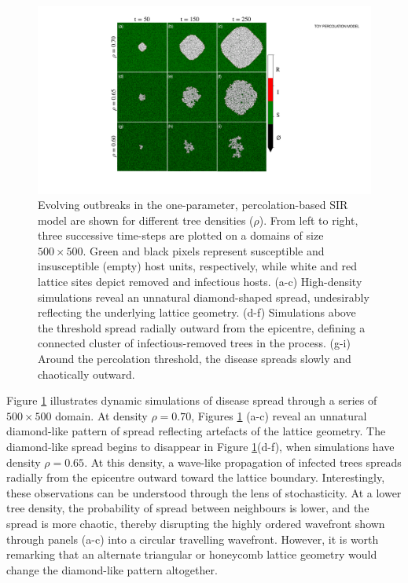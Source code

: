 \begin{figure}
    \centering
    \includegraphics[scale=0.50]{chapter3/figures/figure1-1param-perc.pdf}
    \caption{
        Evolving outbreaks in the one-parameter, percolation-based SIR model are shown for different tree densities ($\rho$).
        From left to right, three successive time-steps are plotted on a domains of size $500 \times 500$.
        Green and black pixels represent susceptible and insusceptible (empty) host units, respectively, 
        while white and red lattice sites depict removed and infectious hosts. 
        (a-c) High-density simulations reveal an unnatural diamond-shaped spread, undesirably reflecting the underlying lattice geometry.
        (d-f) Simulations above the threshold spread radially outward from the epicentre, defining a connected cluster of infectious-removed trees in the process. (g-i) Around the percolation threshold, the disease spreads slowly and chaotically outward. 
        }
    \label{fig:ch3-perc-spread}
\end{figure}

Figure \ref{fig:ch3-perc-spread} illustrates dynamic simulations of disease spread through a series of $500 \times 500 $ domain. At density $\rho=0.70$, Figures \ref{fig:ch3-perc-spread} (a-c) reveal an unnatural diamond-like pattern of spread reflecting artefacts of the lattice geometry.
The diamond-like spread begins to disappear in Figure \ref{fig:ch3-perc-spread}(d-f), when simulations have density $\rho=0.65$. At this density, a wave-like propagation of infected trees spreads radially from the epicentre outward toward the lattice boundary. Interestingly, these observations can be understood through the lens of stochasticity. At a lower tree density, the probability of spread between neighbours is lower, and the spread is more chaotic, thereby disrupting the highly ordered wavefront shown through panels (a-c) into a circular travelling wavefront.
However, it is worth remarking that an alternate triangular or honeycomb lattice geometry would change the diamond-like pattern altogether.

